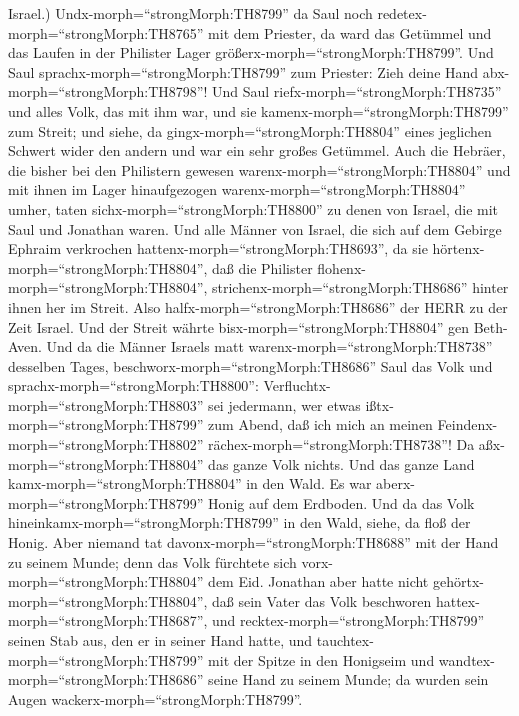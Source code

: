Israel.)  Undx-morph=``strongMorph:TH8799'' da Saul noch
redetex-morph=``strongMorph:TH8765'' mit dem Priester, da ward das
Getümmel und das Laufen in der Philister Lager
größerx-morph=``strongMorph:TH8799''. Und Saul
sprachx-morph=``strongMorph:TH8799'' zum Priester: Zieh deine Hand
abx-morph=``strongMorph:TH8798''!  Und Saul
riefx-morph=``strongMorph:TH8735'' und alles Volk, das mit ihm war, und
sie kamenx-morph=``strongMorph:TH8799'' zum Streit; und siehe, da
gingx-morph=``strongMorph:TH8804'' eines jeglichen Schwert wider den
andern und war ein sehr großes Getümmel.  Auch die Hebräer,
die bisher bei den Philistern gewesen
warenx-morph=``strongMorph:TH8804'' und mit ihnen im Lager hinaufgezogen
warenx-morph=``strongMorph:TH8804'' umher, taten
sichx-morph=``strongMorph:TH8800'' zu denen von Israel, die mit Saul und
Jonathan waren.  Und alle Männer von Israel, die sich auf
dem Gebirge Ephraim verkrochen hattenx-morph=``strongMorph:TH8693'', da
sie hörtenx-morph=``strongMorph:TH8804'', daß die Philister
flohenx-morph=``strongMorph:TH8804'',
strichenx-morph=``strongMorph:TH8686'' hinter ihnen her im Streit.
 Also halfx-morph=``strongMorph:TH8686'' der HERR zu der
Zeit Israel. Und der Streit währte bisx-morph=``strongMorph:TH8804'' gen
Beth-Aven.  Und da die Männer Israels matt
warenx-morph=``strongMorph:TH8738'' desselben Tages,
beschworx-morph=``strongMorph:TH8686'' Saul das Volk und
sprachx-morph=``strongMorph:TH8800'':
Verfluchtx-morph=``strongMorph:TH8803'' sei jedermann, wer etwas
ißtx-morph=``strongMorph:TH8799'' zum Abend, daß ich mich an meinen
Feindenx-morph=``strongMorph:TH8802''
rächex-morph=``strongMorph:TH8738''! Da aßx-morph=``strongMorph:TH8804''
das ganze Volk nichts.  Und das ganze Land
kamx-morph=``strongMorph:TH8804'' in den Wald. Es war
aberx-morph=``strongMorph:TH8799'' Honig auf dem Erdboden. 
Und da das Volk hineinkamx-morph=``strongMorph:TH8799'' in den Wald,
siehe, da floß der Honig. Aber niemand tat
davonx-morph=``strongMorph:TH8688'' mit der Hand zu seinem Munde; denn
das Volk fürchtete sich vorx-morph=``strongMorph:TH8804'' dem Eid.
 Jonathan aber hatte nicht
gehörtx-morph=``strongMorph:TH8804'', daß sein Vater das Volk beschworen
hattex-morph=``strongMorph:TH8687'', und
recktex-morph=``strongMorph:TH8799'' seinen Stab aus, den er in seiner
Hand hatte, und tauchtex-morph=``strongMorph:TH8799'' mit der Spitze in
den Honigseim und wandtex-morph=``strongMorph:TH8686'' seine Hand zu
seinem Munde; da wurden sein Augen wackerx-morph=``strongMorph:TH8799''.
